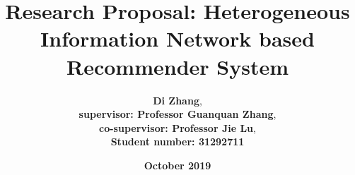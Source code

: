 \documentclass[12pt,a4 paper,title page]{article}
\title{Research Proposal: Heterogeneous Information Network based Recommender System}
\author{\large\textbf{Di Zhang}, \\
\textbf{supervisor: Professor Guanquan Zhang}, \\
\textbf{co-supervisor: Professor Jie Lu}, \\
\textbf{Student number: 31292711}}
\date{\Large{\textbf{October 2019}}}
\theoremstyle{definition}
\begin{document}
\sloppy
\maketitle













\clearpage

\end{document}
